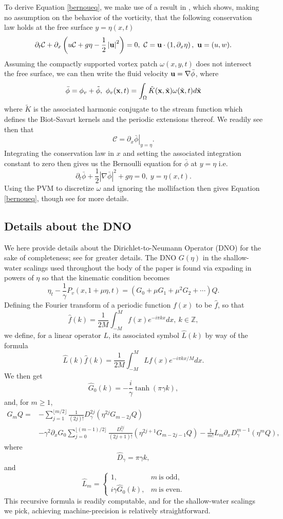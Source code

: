 \documentclass[a4paper,11pt]{article}
\newcommand{\ba}{\begin{array}}
\newcommand{\ea}{\end{array}}
\newcommand{\p}{\partial}
\begin{document}
To derive Equation \eqref{bernoueq}, we make use of a result in \cite{kalisch2}, which shows, making no assumption on the behavior of the vorticity, that the following conservation law holds at the free surface $y=\eta(x,t)$
\[
\p_{t} \mathcal{C} + \p_{x}\left(u\mathcal{C} + g\eta - \frac{1}{2}\left|{\bf u}\right|^{2} \right) = 0, ~ \mathcal{C} = {\bf u}\cdot \left(1,\p_{x}\eta\right), ~ {\bf u} = (u,w).
\]
Assuming the compactly supported vortex patch $\omega(x,y,t)$ does not intersect the free surface, we can then write the fluid velocity ${\bf u} = \nabla \bar{\phi}$, where 
\[
\bar{\phi} =  \phi_{v}+\tilde{\phi}, ~\phi_{v}({\bf x},t) = \int_{\Omega} \tilde{K}({\bf x},\tilde{{\bf x}})\omega(\tilde{{\bf x}},t) d\tilde{{\bf x}}
\]
where $\tilde{K}$ is the associated harmonic conjugate to the stream function which defines the Biot-Savart kernels and the periodic extensions thereof.  We readily see then that
\[
\mathcal{C} =  \p_{x}\left. \bar{\phi}\right|_{y=\eta}.
\]
Integrating the conservation law in $x$ and setting the associated integration constant to zero then gives us the Bernoulli equation for $\bar{\phi}$ at $y=\eta$ i.e. 
\[
\p_{t}\bar{\phi} + \frac{1}{2}\left|\nabla \bar\phi\right|^{2} + g\eta = 0, ~ y=\eta(x,t).
\]
Using the PVM to discretize $\omega$ and ignoring the mollifaction then gives Equation \eqref{bernoueq}, though see \cite{curtis} for more details.  
\subsection*{Details about the DNO}
We here provide details about the Dirichlet-to-Neumann Operator (DNO) for the sake of completeness; see \cite{craig,guyenne} for greater details.    The DNO $G(\eta)$ in the shallow-water scalings used throughout the body of the paper is found via expading in powers of $\eta$ so that the kinematic condition becomes 
\[
\eta_{t} - \frac{1}{\gamma}P_{v}(x,1+\mu \eta,t) = \left(G_{0} + \mu G_{1} + \mu^{2}  G_{2} + \cdots \right)Q.
\]
Defining the Fourier transform of a periodic function $f(x)$ to be $\hat{f}$, so that 
\[
\hat{f}(k) = \frac{1}{2M}\int_{-M}^{M}f(x)e^{-i\pi k x} dx, ~ k\in \mathbb{Z},
\]
we define, for a linear operator $L$, its associated symbol $\hat{L}(k)$ by way of the formula 
\[
\hat{L}(k)\hat{f}(k) = \frac{1}{2M}\int_{-M}^{M} Lf(x) e^{-i\pi k x/M}dx.
\]
We then get 
\[
\hat{G}_{0}(k) = -\frac{i}{\gamma}\tanh(\pi \gamma k),
\]
and, for $m\geq 1$, 
\begin{align*}
G_{m}Q = & -\sum_{j=1}^{\lfloor{m/2}\rfloor}\frac{1}{(2j)!}D^{2j}_{\gamma}\left(\eta^{2j}G_{m-2j}Q\right) \\
& - \gamma^{2}\p_{x}G_{0} \sum_{j=0}^{\lfloor{(m-1)/2}\rfloor}\frac{D_{\gamma}^{2j}}{(2j+1)!}\left(\eta^{2j+1}G_{m-2j-1}Q\right) - \frac{1}{m!}L_{m} \p_{x}D_{\gamma}^{m-1}\left(\eta^{m}Q \right),
\end{align*}
where
\[
\hat{D}_{\gamma} = \pi \gamma k,
\]
and
\[
\hat{L}_{m} = \left\{
\ba{rl}
1,  & m~\mbox{is odd}, \\
i\gamma \hat{G}_{0}(k),  & m~\mbox{is even}.
\ea
\right.
\]
This recursive formula is readily computable, and for the shallow-water scalings we pick, achieving machine-precision is relatively straightforward.  


\end{document}
